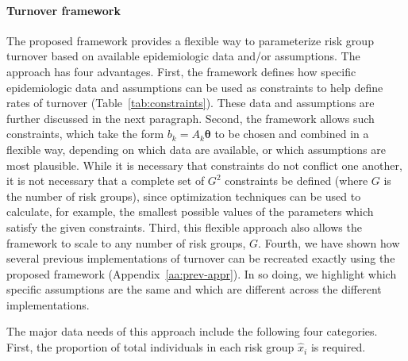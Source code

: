 \paragraph{Turnover framework}
The proposed framework provides a flexible way to parameterize risk group turnover
based on available epidemiologic data and/or assumptions.
The approach has four advantages.
First, the framework defines how specific epidemiologic data and assumptions
can be used as constraints to help define rates of turnover
(Table~\ref{tab:constraints}).
These data and assumptions are further discussed in the next paragraph.
Second, the framework allows such constraints,
which take the form $b_k = A_k \bm{\theta}$
to be chosen and combined in a flexible way,
depending on which data are available, or which assumptions are most plausible.
While it is necessary that constraints do not conflict one another,
it is not necessary that a complete set of $G^2$ constraints be defined
(where $G$ is the number of risk groups),
since optimization techniques can be used to calculate, for example,
the smallest possible values of the parameters which satisfy the given constraints.
Third, this flexible approach also allows the framework to scale
to any number of risk groups, $G$.
Fourth, we have shown how several previous implementations of turnover
\citep{Stigum1994,Eaton2014,Henry2015}
can be recreated exactly using the proposed framework
(Appendix~\ref{aa:prev-appr}).
In so doing, we highlight which specific assumptions are
the same and which are different
across the different implementations.
\par
The major data needs of this approach include the following four categories.
First, the proportion of total individuals in each risk group $\hat{x}_i$ is required.
